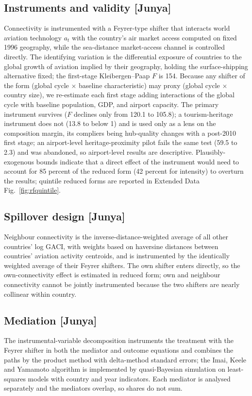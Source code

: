 \documentclass[12pt]{article}
\begin{document}
\subsection*{Instruments and validity [Junya]}
Connectivity is instrumented with a Feyrer-type shifter that interacts
world aviation technology $a_t$ with the country's air market access
computed on fixed 1996 geography, while the sea-distance market-access
channel is controlled directly. The identifying variation is the
differential exposure of countries to the global growth of aviation implied
by their geography, holding the surface-shipping alternative fixed; the
first-stage Kleibergen--Paap $F$ is 154. Because any shifter of the form
(global cycle $\times$ baseline characteristic) may proxy (global cycle
$\times$ country size), we re-estimate each first stage adding interactions
of the global cycle with baseline population, GDP, and airport capacity.
The primary instrument survives ($F$ declines only from 120.1 to 105.8);
a tourism-heritage instrument does not (13.8 to below 1) and is used only
as a lens on the composition margin, its compliers being hub-quality
changes with a post-2010 first stage; an airport-level heritage-proximity
pilot fails the same test (59.5 to 2.3) and was abandoned, so airport-level
results are descriptive. Plausibly-exogenous bounds indicate that a direct
effect of the instrument would need to account for 85 percent of the
reduced form (42 percent for intensity) to overturn the results; quintile
reduced forms are reported in Extended Data Fig.~\ref{fig:rfquintile}.

\subsection*{Spillover design [Junya]}
Neighbour connectivity is the inverse-distance-weighted average of all
other countries' log GACI, with weights based on haversine distances
between countries' aviation activity centroids, and is instrumented by the
identically weighted average of their Feyrer shifters. The own shifter
enters directly, so the own-connectivity effect is estimated in reduced
form; own and neighbour connectivity cannot be jointly instrumented because
the two shifters are nearly collinear within country.

\subsection*{Mediation [Junya]}
The instrumental-variable decomposition instruments the treatment with the
Feyrer shifter in both the mediator and outcome equations and combines the
paths by the product method with delta-method standard errors; the Imai,
Keele and Yamamoto algorithm is implemented by quasi-Bayesian simulation on
least-squares models with country and year indicators. Each mediator is
analysed separately and the mediators overlap, so shares do not sum.
\end{document}
